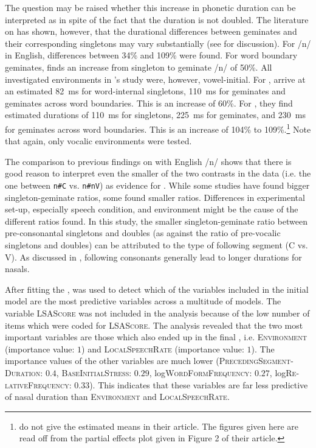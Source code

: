The question may be raised whether this increase in phonetic duration can be interpreted as  in spite of the fact that the duration is not doubled. The literature on  has shown, however, that the durational differences between geminates and their corresponding singletons may vary substantially (see  for discussion). 
For /n/ in English, differences between 34\% and 109\% were found. For word boundary geminates, \cite{Delattre.} finds  an increase from singleton to geminate /n/ of 50\%.  All investigated environments in \citeauthor{Delattre.}'s study were, however, vowel-initial.  For , \citet[86, Figure 2]{Oh.2012} arrive at an estimated 82~ms for word-internal singletons, 110~ms for geminates and geminates across word boundaries. This is an increase of 60\%. For , they find estimated durations of 110~ms for singletons, 225~ms for geminates, and 230~ms for geminates across word boundaries. This is an increase of 104\% to 109\%.\footnote{\citet{Oh.2012} do not give the estimated means in their article. The figures given here are read off from the partial effects plot given in Figure 2 of their article.} Note that again, only vocalic environments were tested.

The comparison to previous findings on  with English /n/ shows that there is good reason to interpret even the smaller of the two contrasts in the data (i.e. the one between \texttt{n\#C} vs. \texttt{n\#nV}) as evidence for . While some studies have found bigger singleton-geminate ratios, some found smaller ratios. Differences in experimental set-up, especially speech condition, and  environment might be the cause of the different ratios found. In this study, the smaller singleton-geminate ratio between pre-consonantal singletons and doubles  (as against the ratio of pre-vocalic singletons and doubles) can be attributed to the type of following segment (C vs. V). As discussed in , following consonants generally lead to longer durations for nasals.

After fitting the ,  was used to detect which of the variables included in the initial model are the most predictive variables across a multitude of models. The variable \textsc{LSAScore} was not included in the  analysis because of the low number of items which were coded for \textsc{LSAScore}. 
The analysis revealed that the two most important variables are those which also ended up in the final , i.e. \textsc{Environment} (importance value: $1$) and \textsc{LocalSpeechRate} (importance value: $1$).  The importance values of the other variables are much lower (\textsc{PrecedingSegment-Duration}:  $0.4$, \textsc{BaseInitialStress}: $0.29$, log\textsc{WordFormFrequency}: $0.27$, log\textsc{Re-lativeFrequency}: $0.33$). This indicates that these variables are far less predictive of nasal duration than \textsc{Environment} and \textsc{LocalSpeechRate}. 


